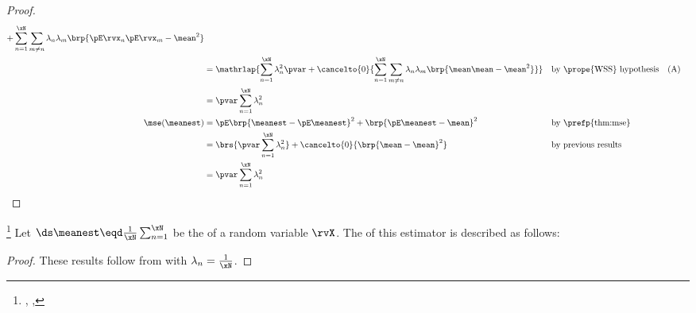 \begin{proof}
\begin{align*}
{     + \sum_{n=1}^{\xN}\sum_{m\neq n  }\lambda_n\lambda_m\brp{\pE\rvx_n\pE\rvx_m  -\mean^2}
       }
  \\&= \mathrlap{
       \sum_{n=1}^{\xN} \lambda_n^2 \pvar
     + \cancelto{0}{
       \sum_{n=1}^{\xN}\sum_{m\neq n  }\lambda_n\lambda_m\brp{\mean\mean-\mean^2}
       }}
    && \text{by \prope{WSS} hypothesis}
    && \text{(A)}
  \\&= \pvar\sum_{n=1}^{\xN} \lambda_n^2
  \\
  \mse(\meanest)
    &= \pE\brp{\meanest-\pE\meanest}^2
        +\brp{\pE\meanest-\mean}^2
    && \text{by \prefp{thm:mse}}
  \\&= \brs{\pvar\sum_{n=1}^{\xN}\lambda_n^2} + \cancelto{0}{\brp{\mean-\mean}^2}
    && \text{by previous results}
  \\&= \pvar\sum_{n=1}^{\xN}\lambda_n^2
\end{align*}
\end{proof}

\begin{definition}
\label{def:average}
\end{definition}

\begin{corollary}
\footnote{
  ,
  ,
  }
\label{cor:mse_average}
Let $\ds\meanest\eqd\frac{1}{\xN}\sum_{n=1}^\xN$ be the   of a random variable $\rvX$.
The   of this estimator is described as follows:
\end{corollary}
\begin{proof}
These results follow from  with $\lambda_n=\frac{1}{\xN}$.
\end{proof}

